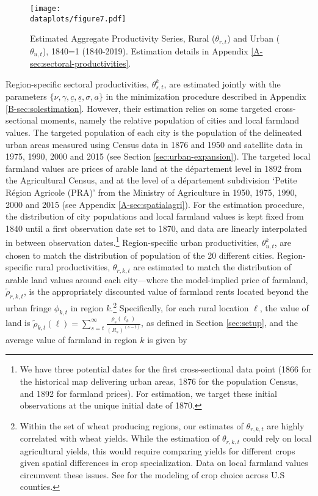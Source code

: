 \documentclass[./20250130-paper.tex]{subfiles}
\begin{document}
\begin{figure}[h!]
	\begin{center}
		\texttt{[image: \\dataplots/figure7.pdf]}
	\end{center}
	\vspace{-0.5cm}
	\caption{Estimated Aggregate Productivity Series, Rural ($\theta_{r,t}$) and Urban ($\theta_{u,t}$), 1840=1 (1840-2019). Estimation details in Appendix \ref{A-sec:sectoral-productivities}.}
	\label{fig:theta}
\end{figure}

Region-specific sectoral productivities, $\theta^k_{s,t}$, are estimated jointly with the parameters $\{\nu, \gamma, \underline{c}, \underline{s}, \sigma, a\}$ in the minimization procedure described in Appendix \ref{B-sec:solestimation}. However, their estimation relies on some targeted cross-sectional moments, namely the relative population of cities and local farmland values. The targeted population of each city is the population of the delineated urban areas measured using Census data in 1876 and 1950 and satellite data in 1975, 1990, 2000 and 2015 (see Section \ref{sec:urban-expansion}). The targeted local farmland values are prices of arable land at the département level in 1892 from the Agricultural Census, and at the level of a département subdivision `Petite Région Agricole (PRA)' from the Ministry of Agriculture in 1950, 1975, 1990, 2000 and 2015 (see Appendix \ref{A-sec:spatialagri}). For the estimation procedure, the distribution of city populations and local farmland values is kept fixed from 1840 until a first observation date set to 1870, and data are linearly interpolated in between observation dates.\footnote{We have three potential dates for the first cross-sectional data point (1866 for the historical map delivering urban areas, 1876 for the population Census, and 1892 for farmland prices). For estimation, we target these initial observations at the unique initial date of 1870.} Region-specific urban productivities, $\theta^k_{u,t}$, are chosen to match the distribution of population of the 20 different cities. Region-specific rural productivities, $\theta_{r,k,t}$ are estimated to match the distribution of arable land values around each city---where the model-implied price of farmland, $\tilde{\rho}_{r,k,t}$, is the appropriately discounted value of farmland rents located beyond the urban fringe $\phi_{k,t}$ in region $k$.\footnote{Within the set of wheat producing regions, our estimates of $\theta_{r,k,t}$ are highly correlated with wheat yields. While the estimation of $\theta_{r,k,t}$ could rely on local agricultural yields, this would require comparing yields for different crops given spatial differences in crop specialization. Data on local farmland values circumvent these issues. See \cite{fiszbein2022agricultural} for the modeling of crop choice across U.S counties.} Specifically, for each rural location $\ell$, the value of land is $\tilde{\rho}_{k,t}(\ell) = \sum_{s=t}^\infty \frac{\rho_s(\ell_k)}{(R_s)^{(s-t)}}$, as defined in Section \ref{sec:setup}, and the average value of farmland in region $k$ is given by
\end{document}
